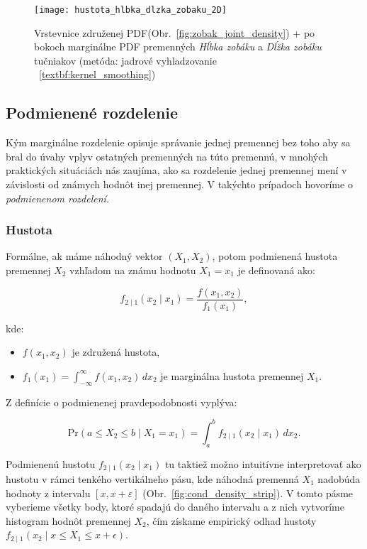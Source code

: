 \begin{figure}[H]
    \centering
    \texttt{[image: hustota\_hlbka\_dlzka\_zobaku\_2D]}
    \caption{Vrstevnice združenej PDF(Obr.~\ref{fig:zobak_joint_density}) + po bokoch marginálne PDF premenných \textit{Hĺbka zobáku} a \textit{Dĺžka zobáku} tučniakov (metóda: jadrové vyhladzovanie ~\ref{textbf:kernel_smoothing})}
    \label{fig:zobak_marg_density}
\end{figure}

\subsection{Podmienené rozdelenie}\label{subsec:conditional_distribution}

Kým marginálne rozdelenie opisuje správanie jednej premennej bez toho aby sa bral do úvahy vplyv ostatných premenných na túto premennú, v mnohých praktických situáciách nás zaujíma, ako sa rozdelenie jednej premennej mení v závislosti od známych hodnôt inej premennej. V takýchto prípadoch hovoríme o \textit{podmienenom rozdelení}.

\subsubsection{Hustota}\label{subsubsec:conditional_density}

Formálne, ak máme náhodný vektor $(X_1, X_2)$, potom podmienená hustota premennej $X_2$ vzhľadom na známu hodnotu $X_1 = x_1$ je definovaná ako:

\begin{equation}
f_{2 \mid 1}(x_2 \mid x_1) = \frac{f(x_1, x_2)}{f_1(x_1)},
\end{equation}

kde:
\begin{itemize}
  \item $f(x_1, x_2)$ je združená hustota,
  \item $f_1(x_1) = \int_{-\infty}^{\infty} f(x_1, x_2) \, dx_2$ je marginálna hustota premennej $X_1$.
\end{itemize}

Z definície o podmienenej pravdepodobnosti vyplýva:

\begin{equation}
\mathrm{Pr}(a \leq X_2 \leq b \mid X_1 = x_1) = \int_a^b f_{2 \mid 1}(x_2 \mid x_1) \, dx_2.
\end{equation}

Podmienenú hustotu $f_{2 \mid 1}(x_2 \mid x_1)$ tu taktiež možno intuitívne interpretovať ako hustotu v rámci tenkého vertikálneho pásu, kde náhodná premenná $X_1$ nadobúda hodnoty z intervalu $[x, x + \varepsilon]$ (Obr.~\ref{fig:cond_density_strip}). V tomto pásme vyberieme všetky body, ktoré spadajú do daného intervalu a z nich vytvoríme histogram hodnôt premennej $X_2$, čím získame empirický odhad hustoty $f_{2 \mid 1}(x_2 \mid x \leq X_1 \leq x +\epsilon)$.

